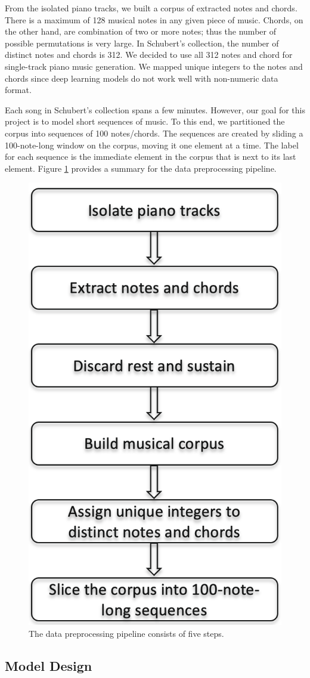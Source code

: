 \documentclass[sigconf,authorversion]{acmart}
\begin{document}
From the isolated piano tracks, we built a corpus of extracted notes and chords. 
There is a maximum of 128 musical notes in any given piece of music. Chords, on the 
other hand, are combination of two or more notes; thus the number of possible permutations 
is very large. In Schubert's collection, the number of distinct notes and chords is 312. 
We decided to use all 312 notes and chord for single-track
piano music generation. We mapped unique integers to the notes and chords since deep 
learning models do not work well with non-numeric data format.

Each song in Schubert's collection spans a few minutes. However, our goal for this 
project is to model short sequences of music. To this end, we partitioned the corpus
into sequences of 100 notes/chords. The sequences are created by sliding a 100-note-long
window on the corpus, moving it one element at a time. The label for each sequence is 
the immediate element in the corpus that is next to its last element. 
Figure \ref{preprocessing} provides a summary for the data preprocessing pipeline.

\begin{figure}[h]
  \centering
  \includegraphics[width=0.5\linewidth]{preprocess.png}
  \caption{The data preprocessing pipeline consists of five steps.}
  \label{preprocessing}
\end{figure}

\subsection{Model Design}
\end{document}
